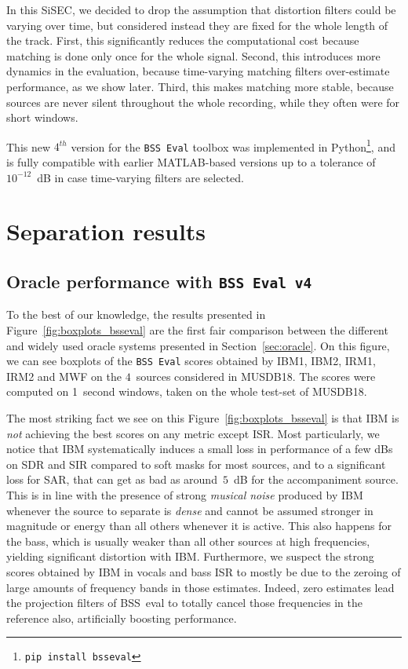 \documentclass{llncs}
\begin{document}
In this SiSEC, we decided to drop the assumption that distortion filters could be varying over time, but considered instead they are fixed for the whole length of the track. First, this significantly reduces the computational cost because matching is done only once for the whole signal. Second, this introduces more dynamics in the evaluation, because time-varying matching filters over-estimate performance, as we show later. Third, this makes matching more stable, because sources are never silent throughout the whole recording, while they often were for short windows.

This new $4^{th}$ version for the \texttt{BSS~Eval} toolbox was implemented in Python\footnote{\texttt{pip install bsseval}}, and is fully compatible with earlier MATLAB-based versions up to a tolerance of $10^{-12}$~dB in case time-varying filters are selected.

\section{Separation results}
\subsection{Oracle performance with \texttt{BSS Eval v4}}
\label{ssec:bsseval-results}

To the best of our knowledge, the results presented in Figure~\ref{fig:boxplots_bsseval} are the first fair comparison between the different and widely used oracle systems presented in Section~\ref{sec:oracle}. On this figure, we can see boxplots of the \texttt{BSS~Eval} scores obtained by IBM1, IBM2, IRM1, IRM2 and MWF on the $4$~sources considered in MUSDB18. The scores were computed on 1~second windows, taken on the whole test-set of MUSDB18.

The most striking fact we see on this Figure~\ref{fig:boxplots_bsseval} is that IBM is \textit{not} achieving the best scores on any metric except ISR. Most particularly, we notice that IBM systematically induces a small loss in performance of a few dBs on SDR and SIR compared to soft masks for most sources, and to a significant loss for SAR, that can get as bad as around~$5$~dB for the accompaniment source. This is in line with the presence of strong \textit{musical noise} produced by IBM whenever the source to separate is \textit{dense} and cannot be assumed stronger in magnitude or energy than all others whenever it is active. This also happens for the bass, which is usually weaker than all other sources at high frequencies, yielding significant distortion with IBM. Furthermore, we suspect the strong scores obtained by IBM in vocals and bass ISR to mostly be due to the zeroing of large amounts of frequency bands in those estimates. Indeed, zero estimates lead the projection filters of BSS~eval to totally cancel those frequencies in the reference also, artificially boosting performance.
\end{document}

